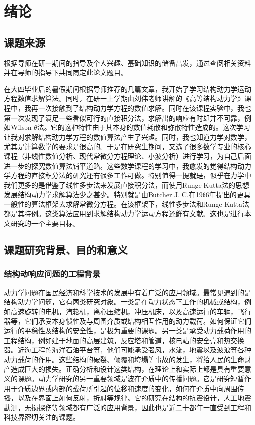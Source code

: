 \chapter{绪论}
%
\section{课题来源}
根据导师在研一期间的指导及个人兴趣、基础知识的储备出发，通过查阅相关资料并在导师的指导下共同商定此论文题目。

在大四毕业后的暑假期间根据导师推荐的几篇文章\cite{YangChao2015b}，我开始了学习结构动力学运动方程数值求解算法。同时，在研一上学期由刘伟老师讲解的《高等结构动力学》课程中，我再一次接触到了结构动力学方程的数值求解。同时在该课程实验中，我也第一次发现了满足一些看似可行的直接积分法，求解出的响应有时却并不可靠，例如Wilson-$\theta$法。它的这种特性由于其本身的数值耗散和弥散特性造成的。这次学习让我对求解结构动力学方程的数值算法产生了兴趣。同时，我也知道力学对数学，尤其是计算数学的要求是很高的。于是在研究生期间，又选了很多数学专业的核心课程（非线性数值分析、现代常微分方程理论、小波分析）进行学习，为自己后面进一步的探究数值算法铺平道路。这些数学课程的学习中，我愈发的觉得结构动力学方程的直接积分法的研究还有很多工作可做。特别值得一提就是，似乎在力学中我们更多的是借鉴了线性多步法来发展直接积分法，而使用Runge-Kutta法的思想发展结构动力学求解算法少之甚少。特别就是由Butcher J. C.在1966年提出的更具一般性的算法框架去求解常微分方程\cite{Butcher1966b}。在该框架下，线性多步法和Runge-Kutta法都是其特例。这类算法应用到求解结构动力学运动方程还鲜有文献。这也是进行本文研究的一个主要目标。
\section{课题研究背景、目的和意义}
\subsection{结构动响应问题的工程背景}
动力学问题在国民经济和科学技术的发展中有着广泛的应用领域。最常见遇到的是结构动力学问题，它有两类研究对象。一类是在动力状态下工作的机械或结构，例如高速旋转的电机，汽轮机，离心压缩机，冲压机床，以及高速运行的车辆，飞行器等，它们承受本身惯性及与周围介质或结构相互作用的动力载荷。如何保证它们运行的平稳性及结构的安全性，是极为重要的课题。另一类是承受动力载荷作用的工程结构，例如建于地面的高层建筑，反应塔和管道，核电站的安全壳和热交换器。近海工程的海洋石油平台等，他们可能承受强风，水流，地震以及波浪等各种动力载荷的作用。这些结构的破裂、倾覆和垮塌等事故的发生，将给人民的生命财产造成巨大的损失。正确分析和设计这类结构，在理论上和实际上都是具有重要意义的课题。动力学研究的另一重要领域是波在介质中的传播问题。它是研究短暂作用于介质边界或内部的载荷所引起的位移和速度的变化，如何在介质中向周围传播，以及在界面上如何反射，折射等规律。它的研究在结构的抗震设计，人工地震勘测，无损探伤等领域都有广泛的应用背景，因此也是近二十都年一直受到工程和科技界密切关注的课题。
